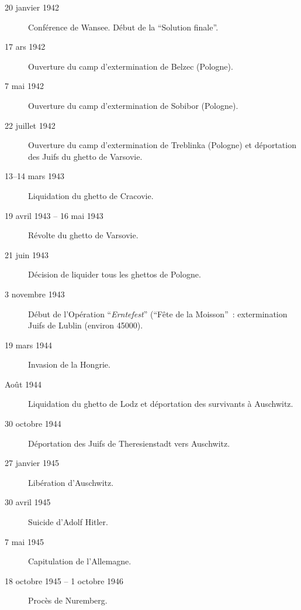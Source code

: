 \begin{description}
    \item[20 janvier 1942] Conférence de Wansee. Début de la \enquote{Solution finale}.

    \item[17 ars 1942] Ouverture du camp d'extermination de Belzec (Pologne).

    \item[7 mai 1942] Ouverture du camp d'extermination de Sobibor (Pologne).

    \item[22 juillet 1942] Ouverture du camp d'extermination de Treblinka (Pologne) et déportation des Juifs du ghetto de Varsovie.

    \item[13--14 mars 1943] Liquidation du ghetto de Cracovie.

    \item[19 avril 1943 -- 16 mai 1943] Révolte du ghetto de Varsovie.

    \item[21 juin 1943] Décision de liquider tous les ghettos de Pologne.

    \item[3 novembre 1943] Début de l'Opération \enquote{\textit{Erntefest}} (\enquote{Fête de la Moisson}~: extermination Juifs de Lublin (environ 45000).

    \item[19 mars 1944] Invasion de la Hongrie.

    \item[Août 1944] Liquidation du ghetto de Lodz et déportation des survivants à Auschwitz.

    \item[30 octobre 1944] Déportation des Juifs de Theresienstadt vers Auschwitz.

    \item[27 janvier 1945] Libération d'Auschwitz.

    \item[30 avril 1945] Suicide d'Adolf Hitler.

    \item[7 mai 1945] Capitulation de l'Allemagne.
    
    \item[18 octobre 1945 -- 1\ier{} octobre 1946] Procès de Nuremberg.

\end{description}